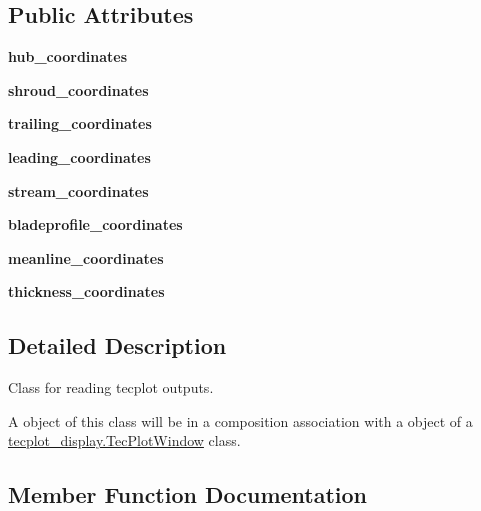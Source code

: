 \subsection*{Public Attributes}
\begin{DoxyCompactItemize}
\item 
\hypertarget{a00125_a2ccc38e7f7503e06d5c5fad58a071f80}{}\label{a00125_a2ccc38e7f7503e06d5c5fad58a071f80} 
{\bfseries hub\+\_\+coordinates}
\item 
\hypertarget{a00125_a583d4851d722f76e18ec7841357b4ea7}{}\label{a00125_a583d4851d722f76e18ec7841357b4ea7} 
{\bfseries shroud\+\_\+coordinates}
\item 
\hypertarget{a00125_ab6edfe4cfa33db98eb1414228f78a303}{}\label{a00125_ab6edfe4cfa33db98eb1414228f78a303} 
{\bfseries trailing\+\_\+coordinates}
\item 
\hypertarget{a00125_af991756a166df02da0a122d8d7c5c372}{}\label{a00125_af991756a166df02da0a122d8d7c5c372} 
{\bfseries leading\+\_\+coordinates}
\item 
\hypertarget{a00125_a4c8e60241684e96d45eabfb99e6955fd}{}\label{a00125_a4c8e60241684e96d45eabfb99e6955fd} 
{\bfseries stream\+\_\+coordinates}
\item 
\hypertarget{a00125_abd9898f018cbb1686522d50721f851a7}{}\label{a00125_abd9898f018cbb1686522d50721f851a7} 
{\bfseries bladeprofile\+\_\+coordinates}
\item 
\hypertarget{a00125_a33fc4c19a7badee5e2a88f3be97f8efb}{}\label{a00125_a33fc4c19a7badee5e2a88f3be97f8efb} 
{\bfseries meanline\+\_\+coordinates}
\item 
\hypertarget{a00125_a894f4ab5042e885fa8349c50c37059ac}{}\label{a00125_a894f4ab5042e885fa8349c50c37059ac} 
{\bfseries thickness\+\_\+coordinates}
\end{DoxyCompactItemize}


\subsection{Detailed Description}
Class for reading tecplot outputs. 

A object of this class will be in a composition association with a object of a \hyperlink{a00117}{tecplot\+\_\+display.\+Tec\+Plot\+Window} class. 

\subsection{Member Function Documentation}
\hypertarget{a00125_a9cf438934b57cd1d0bef90bcc00f27ac}{}\label{a00125_a9cf438934b57cd1d0bef90bcc00f27ac} 
